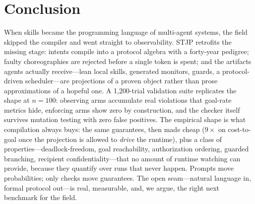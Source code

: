 \documentclass{article}
\newcommand{\stjp}{\textsc{STJP}}
\begin{document}
\section{Conclusion}\label{sec:conc}
When skills became the programming language of multi-agent systems, the field skipped the compiler and went straight to observability. \stjp{} retrofits the missing stage: intents compile into a protocol algebra with a forty-year pedigree; faulty choreographies are rejected before a single token is spent; and the artifacts agents actually receive---lean local skills, generated monitors, guards, a protocol-driven scheduler---are projections of a proven object rather than prose approximations of a hopeful one. A 1{,}200-trial validation suite replicates the shape at $n{=}100$: observing arms accumulate real violations that goal-rate metrics hide, enforcing arms show zero by construction, and the checker itself survives mutation testing with zero false positives. The empirical shape is what compilation always buys: the same guarantees, then made cheap ($9\times$ on cost-to-goal once the projection is allowed to \emph{drive} the runtime), plus a class of properties---deadlock-freedom, goal reachability, authorization ordering, guarded branching, recipient confidentiality---that no amount of runtime watching can provide, because they quantify over runs that never happen. Prompts move probabilities; only checks move guarantees. The open seam---natural language in, formal protocol out---is real, measurable, and, we argue, the right next benchmark for the field.
\end{document}
